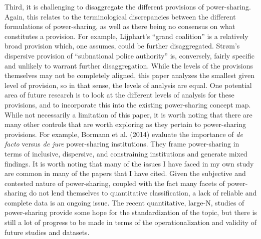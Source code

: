 \documentclass[12pt]{article}
\begin{document}
Third, it is challenging to disaggregate the different provisions of power-sharing. Again, this relates to the terminological discrepancies between the different formulations of power-sharing, as well as there being no consensus on what constitutes a provision. For example, Lijphart’s ``grand coalition'' is a relatively broad provision which, one assumes, could be further disaggregated. Strøm’s dispersive provision of ``subnational police authority'' is, conversely, fairly specific and unlikely to warrant further disaggregation. While the levels of the provisions themselves may not be completely aligned, this paper analyzes the smallest given level of provision, so in that sense, the levels of analysis are equal. One potential area of future research is to look at the different levels of analysis for these provisions, and to incorporate this into the existing power-sharing concept map. While not necessarily a limitation of this paper, it is worth noting that there are many other controls that are worth exploring as they pertain to power-sharing provisions. For example, Bormann et al. (2014) evaluate the importance of \textit{de facto} versus \textit{de jure} power-sharing institutions. They frame power-sharing in terms of inclusive, dispersive, and constraining institutions and generate mixed findings. It is worth noting that many of the issues I have faced in my own study are common in many of the papers that I have cited. Given the subjective and contested nature of power-sharing, coupled with the fact many facets of power-sharing do not lend themselves to quantitative classification, a lack of reliable and complete data is an ongoing issue. The recent quantitative, large-N, studies of power-sharing provide some hope for the standardization of the topic, but there is still a lot of progress to be made in terms of the operationalization and validity of future studies and datasets.  
\end{document}
